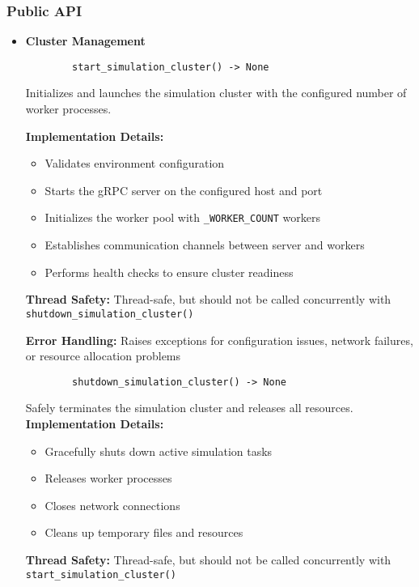 \subsubsection{Public API}
\begin{itemize}
	\item \textbf{Cluster Management}
	\begin{verbatim}
		start_simulation_cluster() -> None
	\end{verbatim}

	 Initializes and launches the simulation cluster with the configured number of worker processes.

	 \textbf{Implementation Details:}
	 \begin{itemize}
	 	\item Validates environment configuration
	 	\item Starts the gRPC server on the configured host and port
	 	\item Initializes the worker pool with \texttt{\_WORKER\_COUNT} workers
	 	\item Establishes communication channels between server and workers
	 	\item Performs health checks to ensure cluster readiness
	 \end{itemize}

	 \textbf{Thread Safety:} Thread-safe, but should not be called concurrently with \texttt{shutdown\_simulation\_cluster()}

	 \textbf{Error Handling:} Raises exceptions for configuration issues, network failures, or resource allocation problems


	\begin{verbatim}
		shutdown_simulation_cluster() -> None
	\end{verbatim}


	Safely terminates the simulation cluster and releases all resources.
	\textbf{Implementation Details:}
	\begin{itemize}
		\item Gracefully shuts down active simulation tasks
		\item Releases worker processes
		\item Closes network connections
		\item Cleans up temporary files and resources
	\end{itemize}

	\textbf{Thread Safety:} Thread-safe, but should not be called concurrently with \texttt{start\_simulation\_cluster()}


\end{itemize}

